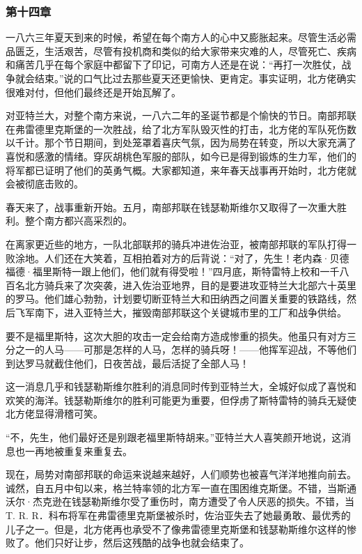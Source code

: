 \subsubsection{第十四章}

\par 一八六三年夏天到来的时候，希望在每个南方人的心中又膨胀起来。尽管生活必需品匮乏，生活艰苦，尽管有投机商和类似的给大家带来灾难的人，尽管死亡、疾病和痛苦几乎在每个家庭中都留下了印记，可南方人还是在说：“再打一次胜仗，战争就会结束。”说的口气比过去那些夏天还更愉快、更肯定。事实证明，北方佬确实很难对付，但他们最终还是开始瓦解了。
\par 对亚特兰大，对整个南方来说，一八六二年的圣诞节都是个愉快的节日。南部邦联在弗雷德里克斯堡的一次胜战，给了北方军队毁灭性的打击，北方佬的军队死伤数以千计。那个节日期间，到处笼罩着喜庆气氛，因为局势在转变，所以大家充满了喜悦和感激的情绪。穿灰胡桃色军服的部队，如今已是得到锻炼的生力军，他们的将军都已证明了他们的英勇气概。大家都知道，来年春天战事再开始时，北方佬就会被彻底击败的。
\par 春天来了，战事重新开始。五月，南部邦联在钱瑟勒斯维尔又取得了一次重大胜利。整个南方都兴高采烈的。
\par 在离家更近些的地方，一队北部联邦的骑兵冲进佐治亚，被南部邦联的军队打得一败涂地。人们还在大笑着，互相拍着对方的后背说：“对了，先生！老内森·贝德福德·福里斯特一跟上他们，他们就有得受啦！”四月底，斯特雷特上校和一千八百名北方骑兵来了次突袭，进入佐治亚地界，目的是要进攻亚特兰大北部六十英里的罗马。他们雄心勃勃，计划要切断亚特兰大和田纳西之间置关重要的铁路线，然后飞军南下，进入亚特兰大，摧毁南部邦联这个关键城市里的工厂和战争供给。
\par 要不是福里斯特，这次大胆的攻击一定会给南方造成惨重的损失。他虽只有对方三分之一的人马——可那是怎样的人马，怎样的骑兵呀！——他挥军迎战，不等他们到达罗马就截住他们，日夜苦战，最后活捉了全部人马！
\par 这一消息几乎和钱瑟勒斯维尔胜利的消息同时传到亚特兰大，全城好似成了喜悦和欢笑的海洋。钱瑟勒斯维尔的胜利可能更为重要，但俘虏了斯特雷特的骑兵无疑使北方佬显得滑稽可笑。
\par “不，先生，他们最好还是别跟老福里斯特胡来。”亚特兰大人喜笑颜开地说，这消息也一再地被重复来重复去。
\par 现在，局势对南部邦联的命运来说越来越好，人们顺势也被喜气洋洋地推向前去。诚然，自五月中旬以来，格兰特率领的北方军一直在围困维克斯堡。不错，当斯通沃尔·杰克逊在钱瑟勒斯维尔受了重伤时，南方遭受了令人厌恶的损失。不错，当T. R. R．科布将军在弗雷德里克斯堡被杀时，佐治亚失去了她最勇敢、最优秀的儿子之一。但是，北方佬再也承受不了像弗雷德里克斯堡和钱瑟勒斯维尔这样的惨败了。他们只好让步，然后这残酷的战争也就会结束了。
